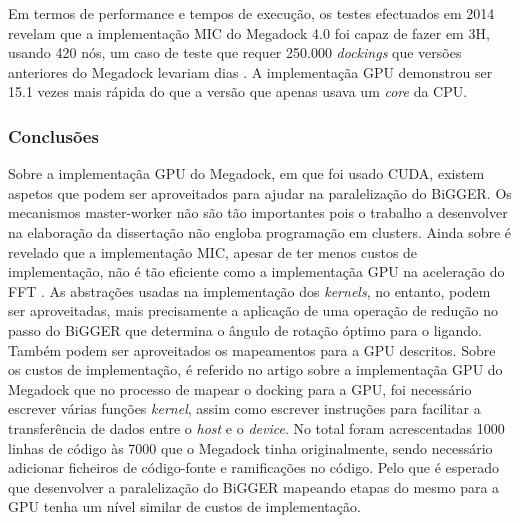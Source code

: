 Em termos de performance e tempos de execução, os testes efectuados em 2014 revelam que a implementação MIC do Megadock 4.0 foi capaz de fazer em 3H, usando 420 nós, um caso de teste que requer 250.000 \textit{dockings} que versões anteriores do Megadock levariam dias \cite{megadock40}. A implementaçãa GPU demonstrou ser 15.1 vezes mais rápida do que a versão que apenas usava um \textit{core} da CPU.
\subsubsection{Conclusões}
Sobre a implementaçãa GPU do Megadock, em que foi usado CUDA, existem aspetos que podem ser aproveitados para ajudar na paralelização do BiGGER. Os mecanismos master-worker não são tão importantes pois o trabalho a desenvolver na elaboração da dissertação não engloba programação em clusters. Ainda sobre \cite{shimoda2015protein} é revelado que a implementação MIC, apesar de ter menos custos de implementação, não é tão eficiente como a implementaçãa GPU na aceleração do FFT . As abstrações usadas na implementação dos \textit{kernels}, no entanto, podem ser aproveitadas, mais precisamente a aplicação de uma operação de redução no passo do BiGGER que determina o ângulo de rotação óptimo para o ligando. Também podem ser aproveitados os mapeamentos para a GPU descritos. Sobre os custos de implementação, é referido no artigo sobre a implementaçãa GPU do Megadock \cite{shimoda2015protein} que no processo de mapear o docking para a GPU, foi necessário escrever várias funções\textit{ kernel}, assim como escrever instruções para facilitar a transferência de dados entre o \textit{host} e o \textit{device}. No total foram acrescentadas 1000 linhas de código às 7000 que o Megadock tinha originalmente, sendo necessário adicionar ficheiros de código-fonte e ramificações no código. Pelo que é esperado que desenvolver a paralelização do BiGGER mapeando etapas do mesmo para a GPU tenha um nível similar de custos de implementação. 

